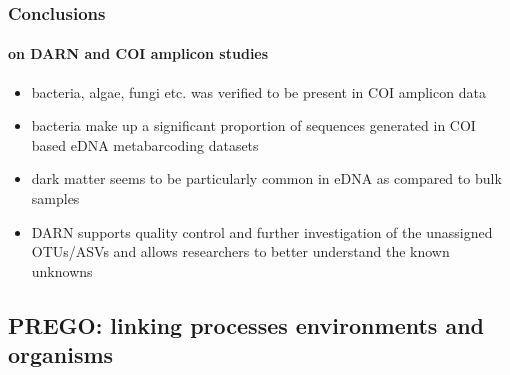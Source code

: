 \documentclass{beamer}
\begin{document}
   \begin{frame}
      \frametitle{Conclusions}
      \framesubtitle{on DARN and COI amplicon studies}
      \begin{itemize}
         \item \small bacteria, algae, fungi etc. was verified to be present in COI amplicon data
         \item \small bacteria make up a significant proportion of sequences generated in COI based eDNA metabarcoding datasets
         \item \small dark matter seems to be particularly common in eDNA as compared to bulk samples
         \item \small DARN supports quality control and further investigation of the unassigned OTUs/ASVs and
               \small allows researchers to better understand the known unknowns
      \end{itemize}

   \end{frame}



   \begin{darkframes}
      \section{
         PREGO: linking processes environments and organisms
      }
   \end{darkframes}
\end{document}

